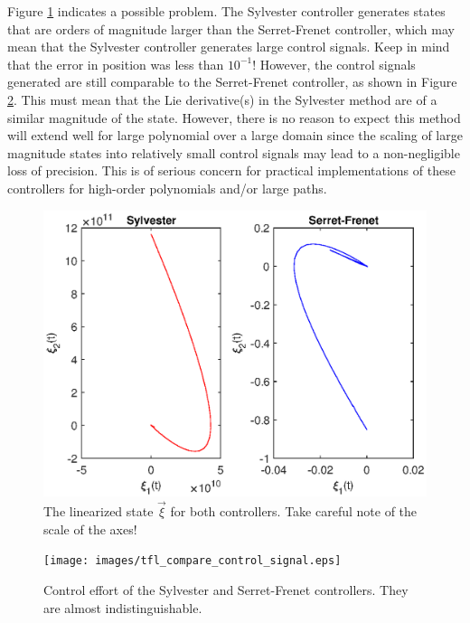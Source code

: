 Figure \ref{fig:tfl_compare_state} indicates a possible problem. The Sylvester controller generates states that are orders of magnitude larger than the Serret-Frenet controller, which may mean that the Sylvester controller generates large control signals. Keep in mind that the error in position was less than $10^{-1}$! However, the control signals generated are still comparable to the Serret-Frenet controller, as shown in Figure \ref{fig:control_effort}. This must mean that the Lie derivative(s) in the Sylvester method are of a similar magnitude of the state. However, there is no reason to expect this method will extend well for large polynomial over a large domain since the scaling of large magnitude states into relatively small control signals may lead to a non-negligible loss of precision. This is of serious concern for practical implementations of these controllers for high-order polynomials and/or large paths.
\begin{figure}[!htbp]
    \centering
    \includegraphics{images/tfl_compare_state.eps}
    \caption{The linearized state $\vec{\xi}$ for both controllers. Take careful note of the scale of the axes!}
    \label{fig:tfl_compare_state}
\end{figure}
\begin{figure}[!htbp]
    \centering
    \texttt{[image: images/tfl\_compare\_control\_signal.eps]}
    \caption{Control effort of the Sylvester and Serret-Frenet controllers. They are almost indistinguishable.}
    \label{fig:control_effort}
\end{figure}

